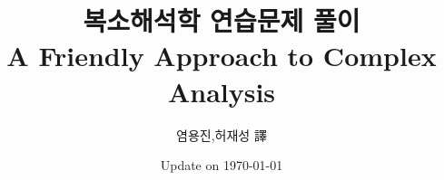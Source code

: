 \documentclass[12pt,twoside]{book}
\numberwithin{equation}{chapter}
\numberwithin{figure}{chapter}
\begin{document}
\title{\bf {\huge 복소해석학 연습문제 풀이}\\ A Friendly Approach to Complex Analysis}
\author{염용진,허재성 譯}
\date{Update on \today}
\maketitle

\setcounter{minitocdepth}{1} 

    
    
%
%



\end{document}
